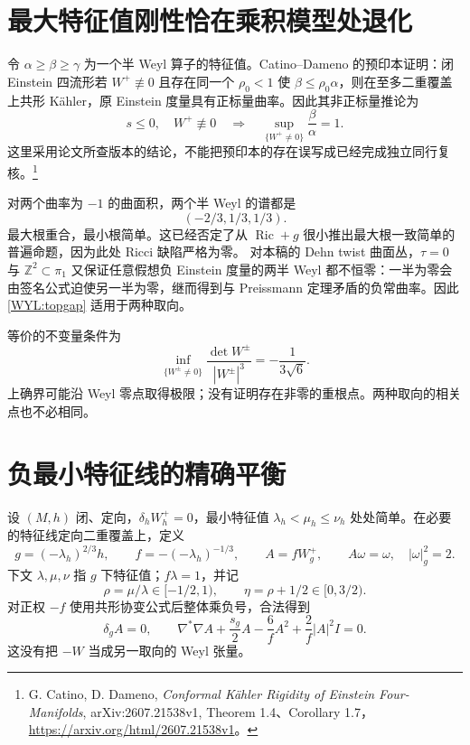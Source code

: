 \documentclass[UTF8,fontset=fandol,zihao=-4,oneside,openany]{ctexbook}
\theoremstyle{cjkplain}
\numberwithin{equation}{chapter}
\DeclareMathOperator{\Ric}{Ric}
\begin{document}
\section{最大特征值刚性恰在乘积模型处退化}
令 $\alpha\ge\beta\ge\gamma$ 为一个半 Weyl 算子的特征值。Catino--Dameno 的预印本证明：闭 Einstein 四流形若 $W^+\not\equiv0$ 且存在同一个 $\rho_0<1$ 使 $\beta\le\rho_0\alpha$，则在至多二重覆盖上共形 Kähler，原 Einstein 度量具有正标量曲率。因此其非正标量推论为
\begin{equation}\label{WYL:topgap}
s\le0,\quad W^+\not\equiv0
\quad\Longrightarrow\quad
\sup_{\{W^+\ne0\}}\frac{\beta}{\alpha}=1.
\end{equation}
这里采用论文所查版本的结论，不能把预印本的存在误写成已经完成独立同行复核。\footnote{G. Catino, D. Dameno, \emph{Conformal Kähler Rigidity of Einstein Four-Manifolds}, arXiv:2607.21538v1, Theorem 1.4、Corollary 1.7，\url{https://arxiv.org/html/2607.21538v1}。}

对两个曲率为 $-1$ 的曲面积，两个半 Weyl 的谱都是
\[
(-2/3,1/3,1/3).
\]
最大根重合，最小根简单。这已经否定了从 $\Ric+g$ 很小推出最大根一致简单的普遍命题，因为此处 Ricci 缺陷严格为零。
对本稿的 Dehn twist 曲面丛，$\tau=0$ 与 $\mathbb Z^2\subset\pi_1$ 又保证任意假想负 Einstein 度量的两半 Weyl 都不恒零：一半为零会由签名公式迫使另一半为零，继而得到与 Preissmann 定理矛盾的负常曲率。因此 \eqref{WYL:topgap} 适用于两种取向。

等价的不变量条件为
\[
\inf_{\{W^\pm\ne0\}}\frac{\det W^\pm}{|W^\pm|^3}
=-\frac1{3\sqrt6}.
\]
上确界可能沿 Weyl 零点取得极限；没有证明存在非零的重根点。两种取向的相关点也不必相同。

\section{负最小特征线的精确平衡}
设 $(M,h)$ 闭、定向，$\delta_hW_h^+=0$，最小特征值 $\lambda_h<\mu_h\le\nu_h$ 处处简单。在必要的特征线定向二重覆盖上，定义
\begin{equation}\label{WYL:normalization}
g=(-\lambda_h)^{2/3}h,\qquad
f=-(-\lambda_h)^{-1/3},\qquad
A=fW_g^+,\qquad A\omega=\omega,\quad |\omega|_g^2=2.
\end{equation}
下文 $\lambda,\mu,\nu$ 指 $g$ 下特征值；$f\lambda=1$，并记
\[
\rho=\mu/\lambda\in[-1/2,1),\qquad
\eta=\rho+1/2\in[0,3/2).
\]
对正权 $-f$ 使用共形协变公式后整体乘负号，合法得到
\begin{equation}\label{WYL:weighted}
\delta_gA=0,\qquad
\nabla^*\nabla A+\frac{s_g}{2}A
-\frac6f A^2+\frac2f|A|^2I=0.
\end{equation}
这没有把 $-W$ 当成另一取向的 Weyl 张量。
\end{document}

